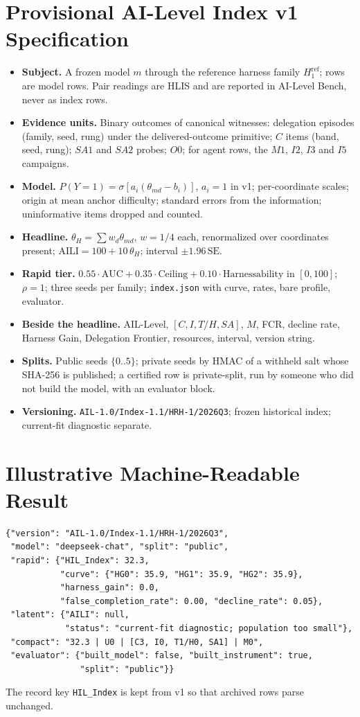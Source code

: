 \section{Provisional AI-Level Index v1 Specification}\label{app:spec}
\begin{itemize}[leftmargin=*,itemsep=1pt]
\item \textbf{Subject.} A frozen model $m$ through the reference harness family $H^{\mathrm{ref}}_1$; rows are model rows. Pair readings are HLIS and are reported in AI-Level Bench, never as index rows.
\item \textbf{Evidence units.} Binary outcomes of canonical witnesses: delegation episodes (family, seed, rung) under the delivered-outcome primitive; $C$ items (band, seed, rung); $SA1$ and $SA2$ probes; $O0$; for agent rows, the $M1$, $I2$, $I3$ and $I5$ campaigns.
\item \textbf{Model.} $P(Y=1) = \sigma[a_i(\theta_{md} - b_i)]$, $a_i = 1$ in v1; per-coordinate scales; origin at mean anchor difficulty; standard errors from the information; uninformative items dropped and counted.
\item \textbf{Headline.} $\theta_H = \sum w_d \theta_{md}$, $w = 1/4$ each, renormalized over coordinates present; $\mathrm{AILI} = 100 + 10\,\theta_H$; interval $\pm 1.96\,\mathrm{SE}$.
\item \textbf{Rapid tier.} $0.55\cdot\mathrm{AUC} + 0.35\cdot\mathrm{Ceiling} + 0.10\cdot\mathrm{Harnessability}$ in $[0, 100]$; $\rho = 1$; three seeds per family; \texttt{index.json} with curve, rates, bare profile, evaluator.
\item \textbf{Beside the headline.} AIL-Level, $[C, I, T/H, SA]$, $M$, FCR, decline rate, Harness Gain, Delegation Frontier, resources, interval, version string.
\item \textbf{Splits.} Public seeds $\{0..5\}$; private seeds by HMAC of a withheld salt whose SHA-256 is published; a certified row is private-split, run by someone who did not build the model, with an evaluator block.
\item \textbf{Versioning.} \texttt{AIL-1.0/\allowbreak Index-1.1/\allowbreak HRH-1/\allowbreak 2026Q3}; frozen historical index; current-fit diagnostic separate.
\end{itemize}

\section{Illustrative Machine-Readable Result}\label{app:json}
\begin{verbatim}
{"version": "AIL-1.0/Index-1.1/HRH-1/2026Q3",
 "model": "deepseek-chat", "split": "public",
 "rapid": {"HIL_Index": 32.3,
           "curve": {"HG0": 35.9, "HG1": 35.9, "HG2": 35.9},
           "harness_gain": 0.0,
           "false_completion_rate": 0.00, "decline_rate": 0.05},
 "latent": {"AILI": null,
            "status": "current-fit diagnostic; population too small"},
 "compact": "32.3 | U0 | [C3, I0, T1/H0, SA1] | M0",
 "evaluator": {"built_model": false, "built_instrument": true,
               "split": "public"}}
\end{verbatim}
\noindent The record key \texttt{HIL\_Index} is kept from v1 so that archived rows parse unchanged.

